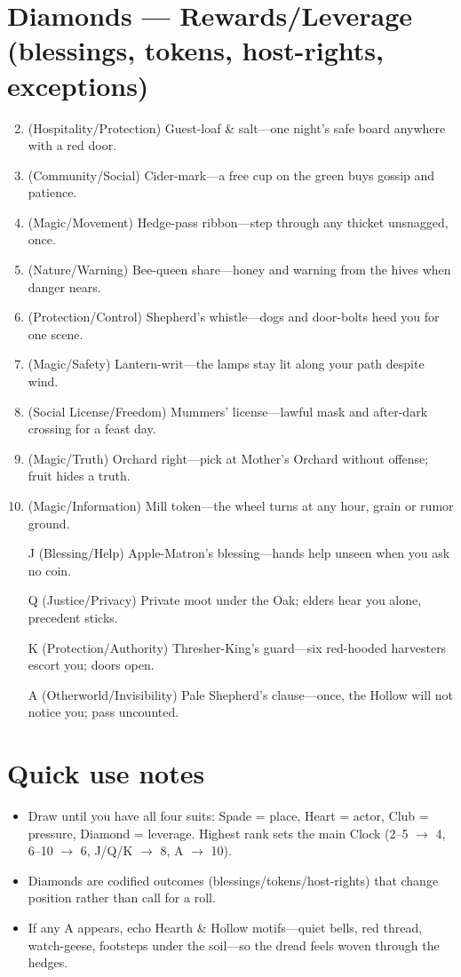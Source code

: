 \section*{Diamonds --- Rewards/Leverage (blessings, tokens, host-rights, exceptions)}
\label{sec:aelaerem-rewards}
\begin{enumerate}
\setcounter{enumi}{1}
\item (Hospitality/Protection) Guest-loaf \& salt---one night's safe board anywhere with a red door.
\item (Community/Social) Cider-mark---a free cup on the green buys gossip and patience.
\item (Magic/Movement) Hedge-pass ribbon---step through any thicket unsnagged, once.
\item (Nature/Warning) Bee-queen share---honey and warning from the hives when danger nears.
\item (Protection/Control) Shepherd's whistle---dogs and door-bolts heed you for one scene.
\item (Magic/Safety) Lantern-writ---the lamps stay lit along your path despite wind.
\item (Social License/Freedom) Mummers' license---lawful mask and after-dark crossing for a feast day.
\item (Magic/Truth) Orchard right---pick at Mother's Orchard without offense; fruit hides a truth.
\item (Magic/Information) Mill token---the wheel turns at any hour, grain or rumor ground.
\item[J] (Blessing/Help) Apple-Matron's blessing---hands help unseen when you ask no coin.
\item[Q] (Justice/Privacy) Private moot under the Oak; elders hear you alone, precedent sticks.
\item[K] (Protection/Authority) Thresher-King's guard---six red-hooded harvesters escort you; doors open.
\item[A] (Otherworld/Invisibility) Pale Shepherd's clause---once, the Hollow will not notice you; pass uncounted.
\end{enumerate}

\section*{Quick use notes}
\label{sec:aelaerem-quick-use}
\begin{itemize}
\item Draw until you have all four suits: Spade = place, Heart = actor, Club = pressure, Diamond = leverage. Highest rank sets the main Clock (2--5 $\rightarrow$ 4, 6--10 $\rightarrow$ 6, J/Q/K $\rightarrow$ 8, A $\rightarrow$ 10).
\item Diamonds are codified outcomes (blessings/tokens/host-rights) that change position rather than call for a roll.
\item If any A appears, echo Hearth \& Hollow motifs---quiet bells, red thread, watch-geese, footsteps under the soil---so the dread feels woven through the hedges.
\end{itemize}

